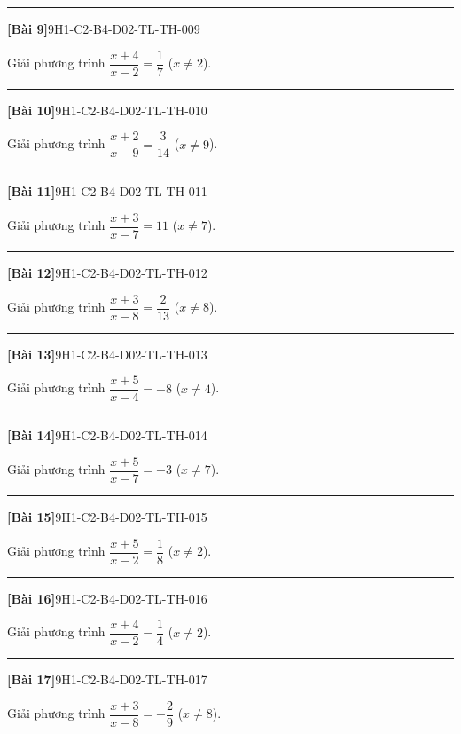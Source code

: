 \documentclass[12pt,a4paper]{article}
\newif\ifloigiai
\newenvironment{cauhoi}[2]{%
  \par\medskip\noindent\rule{\textwidth}{0.4pt}\par\nopagebreak
  \noindent\textbf{[#1]}\hfill{\scriptsize\ttfamily #2}\par\nopagebreak\smallskip}{\par}
\newcommand{\loigiai}[1]{\ifloigiai\par\smallskip\noindent\textit{Lời giải.} #1\par\fi}
\begin{document}
\begin{cauhoi}{Bài 9}{9H1-C2-B4-D02-TL-TH-009}
Giải phương trình $\dfrac{x+4}{x-2}=\dfrac{1}{7}$ ($x\ne 2$).
\loigiai{Điều kiện $x\ne 2$. Nhân hai vế với $x-2$: $x+4=\dfrac{1}{7}(x-2)$. Giải ta được $x=-5$ (thoả điều kiện).}
\end{cauhoi}
\begin{cauhoi}{Bài 10}{9H1-C2-B4-D02-TL-TH-010}
Giải phương trình $\dfrac{x+2}{x-9}=\dfrac{3}{14}$ ($x\ne 9$).
\loigiai{Điều kiện $x\ne 9$. Nhân hai vế với $x-9$: $x+2=\dfrac{3}{14}(x-9)$. Giải ta được $x=-5$ (thoả điều kiện).}
\end{cauhoi}
\begin{cauhoi}{Bài 11}{9H1-C2-B4-D02-TL-TH-011}
Giải phương trình $\dfrac{x+3}{x-7}=11$ ($x\ne 7$).
\loigiai{Điều kiện $x\ne 7$. Nhân hai vế với $x-7$: $x+3=11(x-7)$. Giải ta được $x=8$ (thoả điều kiện).}
\end{cauhoi}
\begin{cauhoi}{Bài 12}{9H1-C2-B4-D02-TL-TH-012}
Giải phương trình $\dfrac{x+3}{x-8}=\dfrac{2}{13}$ ($x\ne 8$).
\loigiai{Điều kiện $x\ne 8$. Nhân hai vế với $x-8$: $x+3=\dfrac{2}{13}(x-8)$. Giải ta được $x=-5$ (thoả điều kiện).}
\end{cauhoi}
\begin{cauhoi}{Bài 13}{9H1-C2-B4-D02-TL-TH-013}
Giải phương trình $\dfrac{x+5}{x-4}=-8$ ($x\ne 4$).
\loigiai{Điều kiện $x\ne 4$. Nhân hai vế với $x-4$: $x+5=-8(x-4)$. Giải ta được $x=3$ (thoả điều kiện).}
\end{cauhoi}
\begin{cauhoi}{Bài 14}{9H1-C2-B4-D02-TL-TH-014}
Giải phương trình $\dfrac{x+5}{x-7}=-3$ ($x\ne 7$).
\loigiai{Điều kiện $x\ne 7$. Nhân hai vế với $x-7$: $x+5=-3(x-7)$. Giải ta được $x=4$ (thoả điều kiện).}
\end{cauhoi}
\begin{cauhoi}{Bài 15}{9H1-C2-B4-D02-TL-TH-015}
Giải phương trình $\dfrac{x+5}{x-2}=\dfrac{1}{8}$ ($x\ne 2$).
\loigiai{Điều kiện $x\ne 2$. Nhân hai vế với $x-2$: $x+5=\dfrac{1}{8}(x-2)$. Giải ta được $x=-6$ (thoả điều kiện).}
\end{cauhoi}
\begin{cauhoi}{Bài 16}{9H1-C2-B4-D02-TL-TH-016}
Giải phương trình $\dfrac{x+4}{x-2}=\dfrac{1}{4}$ ($x\ne 2$).
\loigiai{Điều kiện $x\ne 2$. Nhân hai vế với $x-2$: $x+4=\dfrac{1}{4}(x-2)$. Giải ta được $x=-6$ (thoả điều kiện).}
\end{cauhoi}
\begin{cauhoi}{Bài 17}{9H1-C2-B4-D02-TL-TH-017}
Giải phương trình $\dfrac{x+3}{x-8}=-\dfrac{2}{9}$ ($x\ne 8$).
\loigiai{Điều kiện $x\ne 8$. Nhân hai vế với $x-8$: $x+3=-\dfrac{2}{9}(x-8)$. Giải ta được $x=-1$ (thoả điều kiện).}
\end{cauhoi}
\end{document}
